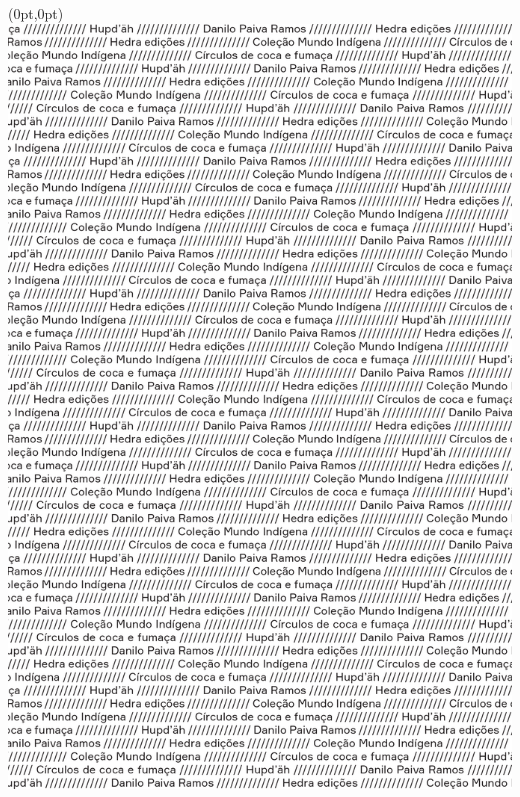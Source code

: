 


\thispagestyle{empty}

\begin{textblock*}{10in}(0pt,0pt)%
\vspace*{-2.3cm}
\hspace*{-3cm}\includegraphics[width=142mm]{./ABERTURA.png}  
\end{textblock*}

